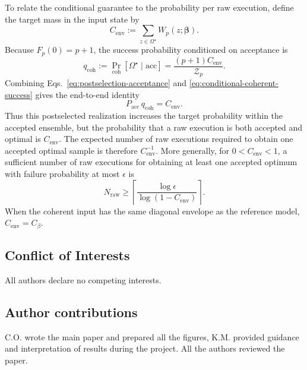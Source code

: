 \documentclass[a4paper,unpublished,onecolumn,11pt]{quantumarticle}
\theoremstyle{definition}
\theoremstyle{remark}
\begin{document}
\begin{appendix}
To relate the conditional guarantee to the probability per raw
execution, define the target mass in the input state by
\begin{equation}
\label{eq:coherent-envelope-target-mass}
C_{\mathrm{env}}
:=
\sum_{z\in\Omega^\star}
W_p(z;\boldsymbol\beta).
\end{equation}
Because $F_p(0)=p+1$, the success probability conditioned on acceptance
is
\begin{equation}
\label{eq:conditional-coherent-success}
q_{\mathrm{coh}}
:=
\Pr_{\mathrm{coh}}
[\Omega^\star\mid\mathrm{acc}]
=
\frac{(p+1)C_{\mathrm{env}}}{\mathcal Z_p}.
\end{equation}
Combining Eqs.~\eqref{eq:postselection-acceptance} and
\eqref{eq:conditional-coherent-success} gives the end-to-end identity
\begin{equation}
\label{eq:end-to-end-coherent-success}
P_{\mathrm{acc}}\,q_{\mathrm{coh}}
=
C_{\mathrm{env}}.
\end{equation}
Thus this postselected realization increases the target probability
within the accepted ensemble, but the probability that a raw execution
is both accepted and optimal is $C_{\mathrm{env}}$. The expected number
of raw executions required to obtain one accepted optimal sample is
therefore $C_{\mathrm{env}}^{-1}$. More generally, for
$0<C_{\mathrm{env}}<1$, a sufficient number of raw executions for
obtaining at least one accepted optimum with failure probability at
most $\epsilon$ is
\begin{equation}
\label{eq:end-to-end-shot-overhead}
N_{\mathrm{raw}}
\ge
\left\lceil
\frac{\log\epsilon}
{\log(1-C_{\mathrm{env}})}
\right\rceil.
\end{equation}
When the coherent input has the same diagonal envelope as the reference
model, $C_{\mathrm{env}}=C_\beta$.





\subsection*{Conflict of Interests}
All authors declare no competing interests.

\subsection*{Author contributions}
C.O. wrote the main paper and prepared all the figures, K.M. provided guidance and interpretation of results during the project. All the authors reviewed the paper.


\end{appendix}
\end{document}
